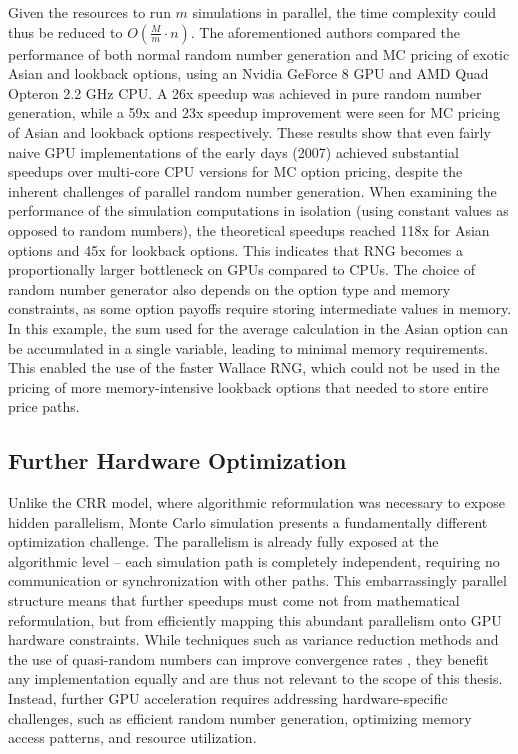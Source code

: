 \documentclass[english,12pt,a4paper,pdftex,sci,utf8]{aaltothesis}
\begin{document}
Given the resources to run $m$ simulations in parallel, the time complexity could thus be reduced to $O(\frac{M}{m}\cdot n)$. The aforementioned authors \cite{nguyen2007gpu} compared the performance of both normal random number generation and MC pricing of exotic Asian and lookback options, using an Nvidia GeForce 8 GPU and AMD Quad Opteron 2.2 GHz CPU. A 26x speedup was achieved in pure random number generation, while a 59x and 23x speedup improvement were seen for MC pricing of Asian and lookback options respectively. These results show that even fairly naive GPU implementations of the early days (2007) achieved substantial speedups over multi-core CPU versions for MC option pricing, despite the inherent challenges of parallel random number generation. When examining the performance of the simulation computations in isolation (using constant values as opposed to random numbers), the theoretical speedups reached 118x for Asian options and 45x for lookback options. This indicates that RNG becomes a proportionally larger bottleneck on GPUs compared to CPUs. The choice of random number generator also depends on the option type and memory constraints, as some option payoffs require storing intermediate values in memory. In this example, the sum used for the average calculation in the Asian option can be accumulated in a single variable, leading to minimal memory requirements. This enabled the use of the faster Wallace RNG, which could not be used in the pricing of more memory-intensive lookback options that needed to store entire price paths.

\subsection{Further Hardware Optimization}
Unlike the CRR model, where algorithmic reformulation was necessary to expose hidden parallelism, Monte Carlo simulation presents a fundamentally different optimization challenge. The parallelism is already fully exposed at the algorithmic level -- each simulation path is completely independent, requiring no communication or synchronization with other paths. This embarrassingly parallel structure means that further speedups must come not from mathematical reformulation, but from efficiently mapping this abundant parallelism onto GPU hardware constraints. While techniques such as variance reduction methods and the use of quasi-random numbers can improve convergence rates \cite{clelow1998implementing}, they benefit any implementation equally and are thus not relevant to the scope of this thesis. Instead, further GPU acceleration requires addressing hardware-specific challenges, such as efficient random number generation, optimizing memory access patterns, and resource utilization. 
\end{document}
